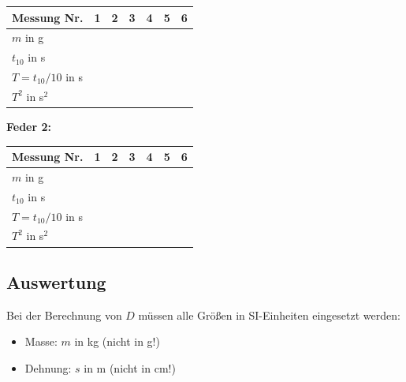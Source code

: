 \documentclass[11pt,a4paper]{scrartcl}
\begin{document}
\begin{center}
	\renewcommand{\arraystretch}{2.0}
	\begin{tabular}{|p{2.5cm}|p{1.5cm}|p{1.5cm}|p{1.5cm}|p{1.5cm}|p{1.5cm}|p{1.5cm}|}
		\hline
		\textbf{Messung Nr.} & \centering\textbf{1} & \centering\textbf{2} & \centering\textbf{3} & \centering\textbf{4} & \centering\textbf{5} & \centering\arraybackslash\textbf{6} \\
		\hline
		$m$ in g & & & & & & \\
		\hline
		$t_{10}$ in s & & & & & & \\
		\hline
		$T = t_{10}/10$ in s & & & & & & \\
		\hline
		$T^2$ in s$^2$ & & & & & & \\
		\hline
	\end{tabular}
\end{center}
\newpage
\textbf{Feder 2:} 
\begin{center}
	\renewcommand{\arraystretch}{2.0}
	\begin{tabular}{|p{2.5cm}|p{1.5cm}|p{1.5cm}|p{1.5cm}|p{1.5cm}|p{1.5cm}|p{1.5cm}|}
		\hline
		\textbf{Messung Nr.} & \centering\textbf{1} & \centering\textbf{2} & \centering\textbf{3} & \centering\textbf{4} & \centering\textbf{5} & \centering\arraybackslash\textbf{6} \\
		\hline
		$m$ in g & & & & & & \\
		\hline
		$t_{10}$ in s & & & & & & \\
		\hline
		$T = t_{10}/10$ in s & & & & & & \\
		\hline
		$T^2$ in s$^2$ & & & & & & \\
		\hline
	\end{tabular}
\end{center}

\vspace{0.5cm}

\subsection*{Auswertung}

\begin{infobox}[title={\faIcon{info-circle} Einheitenumrechnung beachten!}]
	Bei der Berechnung von $D$ müssen alle Größen in SI-Einheiten eingesetzt werden:
	\begin{itemize}
		\item Masse: $m$ in \si{kg} (nicht in g!)
		\item Dehnung: $s$ in \si{m} (nicht in cm!)
	\end{itemize}
\end{infobox}
\end{document}
